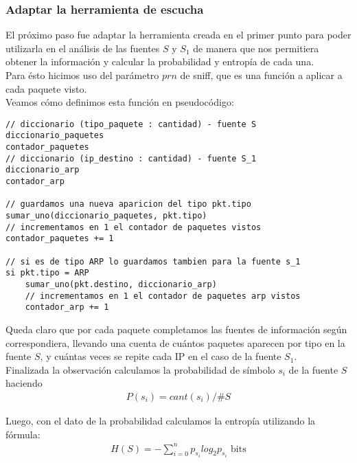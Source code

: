 \subsubsection{Adaptar la herramienta de escucha}

El pr\'oximo paso fue adaptar la herramienta creada en el primer punto para poder utilizarla en el an\'alisis de las fuentes $S$ y $S_1$ de manera que nos permitiera obtener la informaci\'on y calcular la probabilidad y entrop\'ia de cada una.\\

Para \'esto hicimos uso del par\'ametro $prn$ de sniff, que es una funci\'on a aplicar a cada paquete visto. \\
Veamos c\'omo definimos esta funci\'on en pseudoc\'odigo:

\begin{verbatim}
// diccionario (tipo_paquete : cantidad) - fuente S
diccionario_paquetes
contador_paquetes
// diccionario (ip_destino : cantidad) - fuente S_1
diccionario_arp
contador_arp

// guardamos una nueva aparicion del tipo pkt.tipo
sumar_uno(diccionario_paquetes, pkt.tipo)
// incrementamos en 1 el contador de paquetes vistos
contador_paquetes += 1

// si es de tipo ARP lo guardamos tambien para la fuente s_1
si pkt.tipo = ARP
	sumar_uno(pkt.destino, diccionario_arp)
	// incrementamos en 1 el contador de paquetes arp vistos
	contador_arp += 1
\end{verbatim}

Queda claro que por cada paquete completamos las fuentes de informaci\'on seg\'un correspondiera, llevando una cuenta de cu\'antos paquetes aparecen por tipo en la fuente $S$, y cu\'antas veces se repite cada IP en el caso de la fuente $S_1$. \\

Finalizada la observaci\'on calculamos la probabilidad de s\'imbolo $s_{i}$ de la fuente $S$ haciendo\\
\begin{gather*}
P(s_{i}) = cant(s_{i}) / \#S
\end{gather*}
\vspace{0.5cm}

Luego, con el dato de la probabilidad calculamos la entrop\'ia utilizando la f\'ormula:\\
\begin{gather*}
H(S) = - \sum_{i = 0}^{n} p_{s_{i}}log_{2}p_{s_{i}}  \text{ bits}
\end{gather*}
\vspace{1cm}
